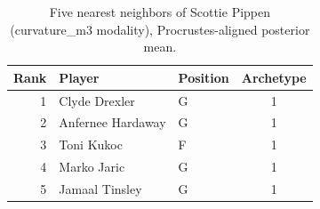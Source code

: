 \begin{table}[htbp]
  \centering\small
  \begin{tabular}{rllc}
    \toprule
    Rank & Player & Position & Archetype \\
    \midrule
    1 & Clyde Drexler & G & 1 \\
    2 & Anfernee Hardaway & G & 1 \\
    3 & Toni Kukoc & F & 1 \\
    4 & Marko Jaric & G & 1 \\
    5 & Jamaal Tinsley & G & 1 \\
    \bottomrule
  \end{tabular}
  \caption{Five nearest neighbors of Scottie Pippen (curvature_m3 modality), Procrustes-aligned posterior mean.}
  \label{tab:Scottie_Pippen_neighbors_curvature_m3}
\end{table}

